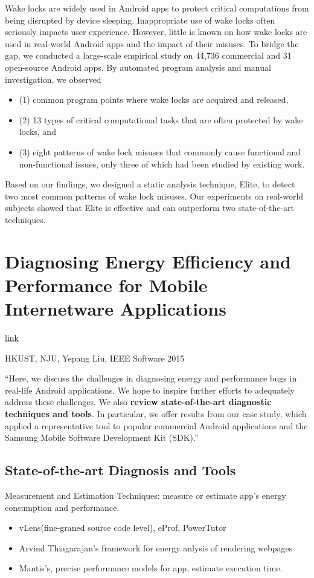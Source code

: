 \documentclass{article}
\begin{document}
Wake locks are widely used in Android apps to protect critical computations from
being disrupted by device sleeping. Inappropriate use of wake locks often
seriously impacts user experience. However, little is known on how wake locks
are used in real-world Android apps and the impact of their misuses. To bridge
the gap, we conducted a large-scale empirical study on 44,736 commercial and 31
open-source Android apps. By automated program analysis and manual
investigation, we observed
\begin{itemize}
\item (1) common program points where wake locks are acquired and released,
\item (2) 13 types of critical computational tasks that are often protected by
  wake locks, and
\item (3) eight patterns of wake lock misuses that commonly cause functional and
  non-functional issues, only three of which had been studied by existing work.
\end{itemize}
Based on our findings, we designed a static
analysis technique, Elite, to detect two most common patterns of wake lock
misuses. Our experiments on real-world subjects showed that Elite is effective
and can outperform two state-of-the-art techniques.


\section{Diagnosing Energy Efficiency and Performance for Mobile Internetware
  Applications}

\href{http://sccpu2.cse.ust.hk/andrewust/files/ieeesoft15.pdf}{link}

HKUST, NJU, Yepang Liu, IEEE Software 2015


``Here, we discuss the challenges in diagnosing energy and performance bugs in
real-life Android applications. We hope to inspire further efforts to adequately
address these challenges. We also \textbf{review state-of-the-art diagnostic
  techniques and tools}. In particular, we offer results from our case study,
which applied a representative tool to popular commercial Android applications
and the Samsung Mobile Software Development Kit (SDK).''

\subsection{State-of-the-art Diagnosis and Tools}
Measurement and Estimation Techniques: measure or estimate app's energy
consumption and performance.
\begin{itemize}
\item vLens(fine-graned source code level), eProf, PowerTutor
\item Arvind Thiagarajan's framework for energy anlysis of rendering webpages
\item Mantis's, precise performance models for app, estimate execution time.
\end{itemize}
\end{document}
